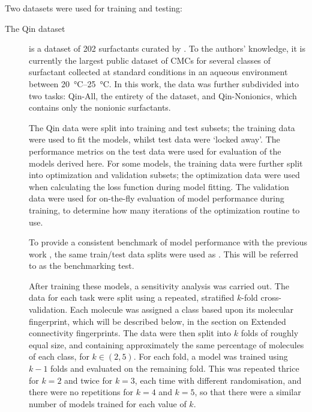 \newcommand{\lrv}{\vec{v}^{\,(p)}}

Two datasets were used for training and testing:

\begin{description}
    \item[The Qin dataset] is a dataset of 202 surfactants curated by
          \citet{qinPredictingCriticalMicelle2021}. To the authors' knowledge,
          it is currently the largest public dataset of CMCs for several classes
          of surfactant collected at standard conditions in an aqueous
          environment between \SIrange{20}{25}{\celsius}. In this work, the data
          was further subdivided into two tasks: Qin-All, the entirety of the
          dataset, and Qin-Nonionics, which contains only the nonionic
          surfactants.

          The Qin data were split into training and test subsets; the training
          data were used to fit the models, whilst test data were `locked away'.
          The performance metrics on the test data were used for evaluation of
          the models derived here. For some models, the training data were
          further split into optimization and validation subsets; the
          optimization data were used when calculating the loss function during
          model fitting. The validation data were used for on-the-fly evaluation
          of model performance during training, to determine how many iterations
          of the optimization routine to use.

          To provide a consistent benchmark of model performance with
          the previous work \cite{qinPredictingCriticalMicelle2021}, the same
          train/test data splits were used as
          \citet{qinPredictingCriticalMicelle2021}. This will be referred to as
          the benchmarking test.

          After training these models, a sensitivity analysis was carried out.
          The data for each task were split using a repeated, stratified
          $k$-fold cross-validation. Each molecule was assigned a class based
          upon its molecular fingerprint, which will be described below, in the
          section on Extended connectivity fingerprints. The data were then
          split into $k$ folds of roughly equal size, and containing
          approximately the same percentage of molecules of each class, for $k
          \in (2, 5)$. For each fold, a model was trained using $k-1$ folds and
          evaluated on the remaining fold. This was repeated thrice for $k = 2$
          and twice for $k = 3$, each time with different randomisation, and
          there were no repetitions for $k = 4$ and $k = 5$, so that there were
          a similar number of models trained for each value of $k$.


\end{description}
